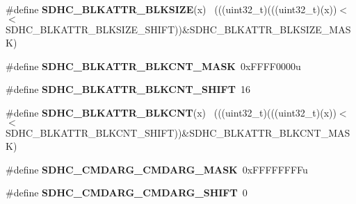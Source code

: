 \begin{DoxyCompactItemize}
\item 
\hypertarget{group___s_d_h_c___register___masks_ga67a8ba2d8eeab8e9f8cc60a679d76fce}{}\#define {\bfseries S\+D\+H\+C\+\_\+\+B\+L\+K\+A\+T\+T\+R\+\_\+\+B\+L\+K\+S\+I\+Z\+E}(x)                                ~(((uint32\+\_\+t)(((uint32\+\_\+t)(x))$<$$<$S\+D\+H\+C\+\_\+\+B\+L\+K\+A\+T\+T\+R\+\_\+\+B\+L\+K\+S\+I\+Z\+E\+\_\+\+S\+H\+I\+F\+T))\&S\+D\+H\+C\+\_\+\+B\+L\+K\+A\+T\+T\+R\+\_\+\+B\+L\+K\+S\+I\+Z\+E\+\_\+\+M\+A\+S\+K)\label{group___s_d_h_c___register___masks_ga67a8ba2d8eeab8e9f8cc60a679d76fce}

\item 
\hypertarget{group___s_d_h_c___register___masks_ga797a081db083b97f61d5f657ae83f752}{}\#define {\bfseries S\+D\+H\+C\+\_\+\+B\+L\+K\+A\+T\+T\+R\+\_\+\+B\+L\+K\+C\+N\+T\+\_\+\+M\+A\+S\+K}~0x\+F\+F\+F\+F0000u\label{group___s_d_h_c___register___masks_ga797a081db083b97f61d5f657ae83f752}

\item 
\hypertarget{group___s_d_h_c___register___masks_ga1461e7582635ec25e017243f95a9e649}{}\#define {\bfseries S\+D\+H\+C\+\_\+\+B\+L\+K\+A\+T\+T\+R\+\_\+\+B\+L\+K\+C\+N\+T\+\_\+\+S\+H\+I\+F\+T}~16\label{group___s_d_h_c___register___masks_ga1461e7582635ec25e017243f95a9e649}

\item 
\hypertarget{group___s_d_h_c___register___masks_ga1b3088859a5a9ee3ccb5f35b757a99a2}{}\#define {\bfseries S\+D\+H\+C\+\_\+\+B\+L\+K\+A\+T\+T\+R\+\_\+\+B\+L\+K\+C\+N\+T}(x)                                  ~(((uint32\+\_\+t)(((uint32\+\_\+t)(x))$<$$<$S\+D\+H\+C\+\_\+\+B\+L\+K\+A\+T\+T\+R\+\_\+\+B\+L\+K\+C\+N\+T\+\_\+\+S\+H\+I\+F\+T))\&S\+D\+H\+C\+\_\+\+B\+L\+K\+A\+T\+T\+R\+\_\+\+B\+L\+K\+C\+N\+T\+\_\+\+M\+A\+S\+K)\label{group___s_d_h_c___register___masks_ga1b3088859a5a9ee3ccb5f35b757a99a2}

\item 
\hypertarget{group___s_d_h_c___register___masks_ga96ab88ba50cc09465c266e3aab2ba3b0}{}\#define {\bfseries S\+D\+H\+C\+\_\+\+C\+M\+D\+A\+R\+G\+\_\+\+C\+M\+D\+A\+R\+G\+\_\+\+M\+A\+S\+K}~0x\+F\+F\+F\+F\+F\+F\+F\+Fu\label{group___s_d_h_c___register___masks_ga96ab88ba50cc09465c266e3aab2ba3b0}

\item 
\hypertarget{group___s_d_h_c___register___masks_gaa96f4afe969ac51d89ac52df46867f0a}{}\#define {\bfseries S\+D\+H\+C\+\_\+\+C\+M\+D\+A\+R\+G\+\_\+\+C\+M\+D\+A\+R\+G\+\_\+\+S\+H\+I\+F\+T}~0\label{group___s_d_h_c___register___masks_gaa96f4afe969ac51d89ac52df46867f0a}


\end{DoxyCompactItemize}
